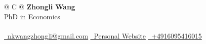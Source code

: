 \documentclass[a4paper,12pt]{article}
\begin{document}



\begin{tabularx}{\linewidth}{@{} C @{}}
\Huge{\textbf{Zhongli Wang}} \\[7.5pt]
PhD in Economics \\
\\
\href{mailto:nkwangzhongli@gmail.com}{\raisebox{-0.05\height}\faEnvelope \ nkwangzhongli@gmail.com}\; %
\href{https://sites.google.com/view/zhongli-wang/}{\raisebox{-0.05\height}\faGlobe \ Personal Website}\; %
\href{tel:+4916095416015}{\raisebox{-0.05\height}\faMobile \ +4916095416015} \\


\end{tabularx}

\fancyfoot[R]{\small\textcolor{lightgray}{Updated: \today}}

\end{document}
